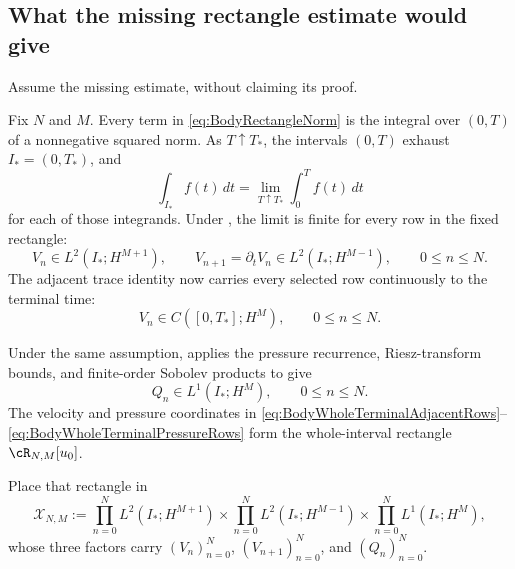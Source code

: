 \subsection{What the missing rectangle estimate would give}\label{sub:BodyCompatibleIntersection}

Assume the missing estimate, without claiming its proof.

Fix \(N\) and \(M\).
Every term in \eqref{eq:BodyRectangleNorm} is the integral over \((0,T)\) of a nonnegative squared norm.
As \(T\uparrow T_*\), the intervals \((0,T)\) exhaust \(I_*=(0,T_*)\), and
\[
  \int_{I_*}f(t)\,dt
  =
  \lim_{T\uparrow T_*}\int_0^T f(t)\,dt
\]
for each of those integrands.
Under , the limit is finite for every row in the fixed rectangle:
\begin{equation}\label{eq:BodyWholeTerminalAdjacentRows}
  V_n\in L^2(I_*;H^{M+1}),
  \qquad
  V_{n+1}=\partial_tV_n\in L^2(I_*;H^{M-1}),
  \qquad 0\leq n\leq N.
\end{equation}
The adjacent trace identity now carries every selected row continuously to the
terminal time:
\[
  V_n\in C([0,T_*];H^M),
  \qquad 0\leq n\leq N.
\]

Under the same assumption,  applies the pressure recurrence, Riesz-transform bounds, and finite-order Sobolev products to give
\begin{equation}\label{eq:BodyWholeTerminalPressureRows}
  Q_n\in L^1(I_*;H^M),
  \qquad 0\leq n\leq N.
\end{equation}
The velocity and pressure coordinates in
\eqref{eq:BodyWholeTerminalAdjacentRows}--\eqref{eq:BodyWholeTerminalPressureRows}
form the whole-interval rectangle \(\cR_{N,M}[u_0]\).

Place that rectangle in
\[
  \mathscr X_{N,M}
  :=
  \prod_{n=0}^{N}L^2(I_*;H^{M+1})
  \times
  \prod_{n=0}^{N}L^2(I_*;H^{M-1})
  \times
  \prod_{n=0}^{N}L^1(I_*;H^M),
\]
whose three factors carry \((V_n)_{n=0}^{N}\),
\((V_{n+1})_{n=0}^{N}\), and \((Q_n)_{n=0}^{N}\).

